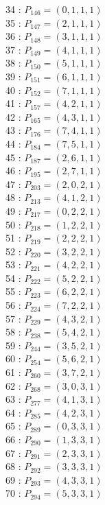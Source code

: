 \documentclass{article}
\begin{document}
{\begin{multicols}{3}
34 : $P_{146}=( 0, 1, 1, 1 )$\\
35 : $P_{147}=( 2, 1, 1, 1 )$\\
36 : $P_{148}=( 3, 1, 1, 1 )$\\
37 : $P_{149}=( 4, 1, 1, 1 )$\\
38 : $P_{150}=( 5, 1, 1, 1 )$\\
39 : $P_{151}=( 6, 1, 1, 1 )$\\
40 : $P_{152}=( 7, 1, 1, 1 )$\\
41 : $P_{157}=( 4, 2, 1, 1 )$\\
42 : $P_{165}=( 4, 3, 1, 1 )$\\
43 : $P_{176}=( 7, 4, 1, 1 )$\\
44 : $P_{184}=( 7, 5, 1, 1 )$\\
45 : $P_{187}=( 2, 6, 1, 1 )$\\
46 : $P_{195}=( 2, 7, 1, 1 )$\\
47 : $P_{203}=( 2, 0, 2, 1 )$\\
48 : $P_{213}=( 4, 1, 2, 1 )$\\
49 : $P_{217}=( 0, 2, 2, 1 )$\\
50 : $P_{218}=( 1, 2, 2, 1 )$\\
51 : $P_{219}=( 2, 2, 2, 1 )$\\
52 : $P_{220}=( 3, 2, 2, 1 )$\\
53 : $P_{221}=( 4, 2, 2, 1 )$\\
54 : $P_{222}=( 5, 2, 2, 1 )$\\
55 : $P_{223}=( 6, 2, 2, 1 )$\\
56 : $P_{224}=( 7, 2, 2, 1 )$\\
57 : $P_{229}=( 4, 3, 2, 1 )$\\
58 : $P_{238}=( 5, 4, 2, 1 )$\\
59 : $P_{244}=( 3, 5, 2, 1 )$\\
60 : $P_{254}=( 5, 6, 2, 1 )$\\
61 : $P_{260}=( 3, 7, 2, 1 )$\\
62 : $P_{268}=( 3, 0, 3, 1 )$\\
63 : $P_{277}=( 4, 1, 3, 1 )$\\
64 : $P_{285}=( 4, 2, 3, 1 )$\\
65 : $P_{289}=( 0, 3, 3, 1 )$\\
66 : $P_{290}=( 1, 3, 3, 1 )$\\
67 : $P_{291}=( 2, 3, 3, 1 )$\\
68 : $P_{292}=( 3, 3, 3, 1 )$\\
69 : $P_{293}=( 4, 3, 3, 1 )$\\
70 : $P_{294}=( 5, 3, 3, 1 )$\\

\end{multicols}}
\end{document}
